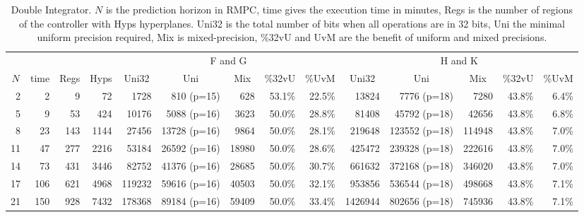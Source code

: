 \begin{table*}[p]
  \centering
  \caption{Double Integrator.\textmd{ $N$ is the prediction horizon in RMPC, time gives the execution time in minutes, Regs is the number of regions of the controller with Hyps hyperplanes. Uni32 is the total number of bits when all operations are in 32 bits, Uni the minimal uniform precision required, Mix is mixed-precision, \%32vU and UvM are the benefit of uniform and mixed precisions.}}
  \label{tab:di}
  \renewcommand{\arraystretch}{1.2}
  \setlength{\tabcolsep}{0.5em} %
  \begin{tabular}{rrrr|rrrrr|rrrrr}
    \toprule
    \multicolumn{4}{c}{} & \multicolumn{5}{|c|}{F and G} & \multicolumn{5}{c}{H and K} \\
    \multicolumn{1}{c}{$N$}&
    \multicolumn{1}{c}{time}&
    \multicolumn{1}{c}{Regs} &
    \multicolumn{1}{c}{Hyps} &
    \multicolumn{1}{|c}{Uni32}&
    \multicolumn{1}{c}{Uni}&
    \multicolumn{1}{c}{Mix}&
    \multicolumn{1}{c}{\%32vU}&
    \multicolumn{1}{c}{\%UvM}&
    \multicolumn{1}{|c}{Uni32}&
    \multicolumn{1}{c}{Uni}&
    \multicolumn{1}{c}{Mix}&
    \multicolumn{1}{c}{\%32vU}&
    \multicolumn{1}{c}{\%UvM} \\
    \midrule
    2 & 2 & 9 & 72 & 1728 & 810 (p=15) & 628 & 53.1\% & 22.5\% & 13824 & 7776 (p=18) & 7280 & 43.8\%& 6.4\% \\
    5 & 9 & 53 & 424 & 10176 & 5088 (p=16) & 3623 & 50.0\% & 28.8\% & 81408 & 45792 (p=18) & 42656 & 43.8\% & 6.8\% \\
    8 & 23 & 143 & 1144 & 27456 & 13728 (p=16) & 9864 & 50.0\%  & 28.1\% & 219648 & 123552 (p=18) & 114948 & 43.8\% & 7.0\% \\
    11 & 47 & 277 & 2216 & 53184 & 26592 (p=16) & 18980 & 50.0\% & 28.6\% & 425472 & 239328 (p=18) & 222616 & 43.8\% & 7.0\% \\
    
    14 & 73 & 431& 3446& 82752& 41376 (p=16)& 28685& 50.0\% & 30.7\% & 661632& 372168 (p=18)& 346020& 43.8\% &7.0\% \\
    
    17 & 106 & 621 & 4968 & 119232 & 59616 (p=16) & 40503 & 50.0\% & 32.1\% & 953856& 536544 (p=18)& 498668& 43.8\% & 7.1\% \\
    
    21 & 150 & 928 & 7432 & 178368 & 89184 (p=16) & 59409 & 50.0\% & 33.4\% & 1426944 & 802656 (p=18) & 745936 & 43.8\% & 7.1\%  \\
    

\end{tabular}
\end{table*}
